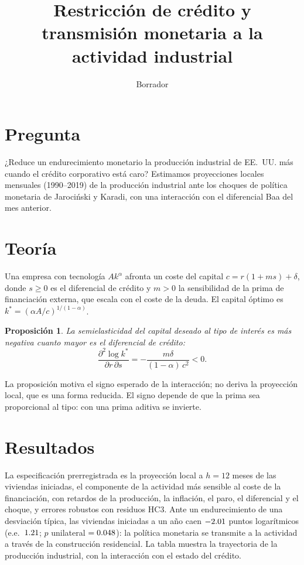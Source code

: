 \documentclass[11pt]{article}
\title{Restricción de crédito y transmisión monetaria a la actividad industrial}
\date{Borrador}
\newtheorem{proposition}{Proposición}
\begin{document}
\maketitle

\section{Pregunta}
¿Reduce un endurecimiento monetario la producción industrial de EE.~UU. más cuando el crédito corporativo está caro?
Estimamos proyecciones locales mensuales (1990--2019) de la producción industrial ante los choques de política monetaria
de Jarociński y Karadi, con una interacción con el diferencial Baa del mes anterior.

\section{Teoría}
Una empresa con tecnología $A k^\alpha$ afronta un coste del capital $c = r(1 + m s) + \delta$, donde $s \geq 0$ es el
diferencial de crédito y $m > 0$ la sensibilidad de la prima de financiación externa, que escala con el coste de la
deuda. El capital óptimo es $k^* = (\alpha A / c)^{1/(1-\alpha)}$.

\begin{proposition}
La semielasticidad del capital deseado al tipo de interés es más negativa cuanto mayor es el diferencial de crédito:
\[
  \frac{\partial^2 \log k^*}{\partial r \, \partial s} = -\frac{m \delta}{(1-\alpha)\, c^2} < 0 .
\]
\end{proposition}

La proposición motiva el signo esperado de la interacción; no deriva la proyección local, que es una forma reducida.
El signo depende de que la prima sea proporcional al tipo: con una prima aditiva se invierte.

\section{Resultados}
La especificación prerregistrada es la proyección local a $h = 12$ meses de las viviendas iniciadas, el componente
de la actividad más sensible al coste de la financiación, con \lags{} retardos de la producción, la inflación, el
paro, el diferencial y el choque, y errores robustos con residuos HC3. Ante un endurecimiento de una desviación típica, las viviendas
iniciadas a un año caen $-2.01$ puntos logarítmicos (e.e.~$1.21$; $p$ unilateral $= 0.048$):
la política monetaria se transmite a la actividad a través de la construcción residencial. La tabla muestra la
trayectoria de la producción industrial, con la interacción con el estado del crédito.
\end{document}
